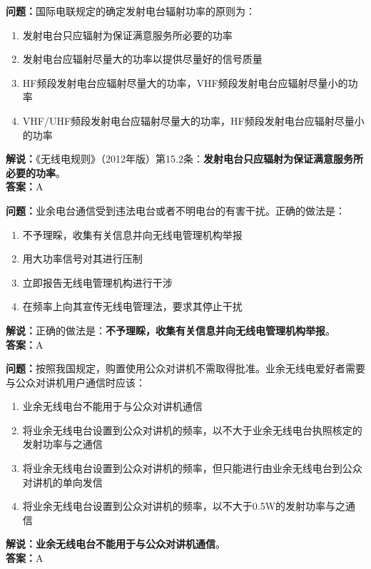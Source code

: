 \documentclass{ctexbook}
\begin{document}
\bigskip


\noindent\textbf{问题：}国际电联规定的确定发射电台辐射功率的原则为：
\begin{enumerate}[label=\Alph*), leftmargin=3em]
	\item 发射电台只应辐射为保证满意服务所必要的功率
	\item 发射电台应辐射尽量大的功率以提供尽量好的信号质量
	\item HF频段发射电台应辐射尽量大的功率，VHF频段发射电台应辐射尽量小的功率
	\item VHF/UHF频段发射电台应辐射尽量大的功率，HF频段发射电台应辐射尽量小的功率
\end{enumerate}
\noindent\textbf{解说：}《无线电规则》（2012年版）第15.2条：\textbf{发射电台只应辐射为保证满意服务所必要的功率}。\\\noindent\textbf{答案：}A



\bigskip


\noindent\textbf{问题：}业余电台通信受到违法电台或者不明电台的有害干扰。正确的做法是：
\begin{enumerate}[label=\Alph*), leftmargin=3em]
	\item 不予理睬，收集有关信息并向无线电管理机构举报
	\item 用大功率信号对其进行压制
	\item 立即报告无线电管理机构进行干涉
	\item 在频率上向其宣传无线电管理法，要求其停止干扰
\end{enumerate}
\noindent\textbf{解说：}正确的做法是：\textbf{不予理睬，收集有关信息并向无线电管理机构举报}。\\\noindent\textbf{答案：}A


\bigskip


\noindent\textbf{问题：}按照我国规定，购置使用公众对讲机不需取得批准。业余无线电爱好者需要与公众对讲机用户通信时应该：
\begin{enumerate}[label=\Alph*), leftmargin=3em]
	\item 业余无线电台不能用于与公众对讲机通信
	\item 将业余无线电台设置到公众对讲机的频率，以不大于业余无线电台执照核定的发射功率与之通信
	\item 将业余无线电台设置到公众对讲机的频率，但只能进行由业余无线电台到公众对讲机的单向发信
	\item 将业余无线电台设置到公众对讲机的频率，以不大于0.5W的发射功率与之通信
\end{enumerate}
\noindent\textbf{解说：}\textbf{业余无线电台不能用于与公众对讲机通信}。\\\noindent\textbf{答案：}A
\end{document}
